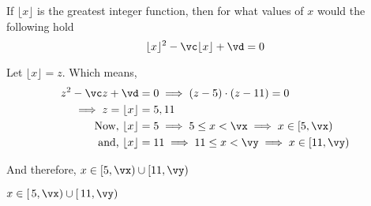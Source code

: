 

\ADD\va\vb\vc
\MULTIPLY\va\vb\vd
\ADD{}\vx
\ADD{}\vy

\question[4] If $\lfloor x\rfloor$ is the greatest integer function, then for what values of $x$ would 
the following hold 
  \[
    \lfloor x\rfloor^2-\vc\lfloor x\rfloor + \vd = 0
  \]

\watchout

\begin{solution}[\halfpage]
  Let $\lfloor x\rfloor = z$. Which means,
  \begin{align}
    z^2 -\vc z + \vd &= 0 \implies (z-\va)\cdot (z-\vb) = 0 \\
    \implies z = \lfloor x\rfloor &= \va, \vb \\
    \text{ Now, } \lfloor x\rfloor &= \va \implies \va\leq x <\vx \implies x\in [\va,\vx) \\
    \text{ and, } \lfloor x\rfloor &= \vb \implies \vb\leq x <\vy \implies x\in [\vb,\vy)
  \end{align}

  And therefore, $x\in [\va,\vx)\cup [\vb,\vy)$

\end{solution}

\ifprintanswers
  \begin{codex}
    $x\in [\,\va,\vx)\cup [\,\vb,\vy)$
  \end{codex}
\fi
